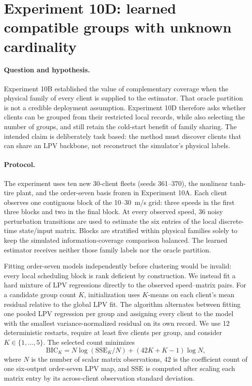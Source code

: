 \section{Experiment 10D: learned compatible groups with unknown cardinality}
\label{sec:experiment10d}

\paragraph{Question and hypothesis.}
Experiment 10B established the value of complementary coverage when the
physical family of every client is supplied to the estimator. That oracle
partition is not a credible deployment assumption. Experiment 10D therefore
asks whether clients can be grouped from their restricted local records, while
also selecting the number of groups, and still retain the cold-start benefit
of family sharing. The intended claim is deliberately task based: the method
must discover clients that can share an LPV backbone, not reconstruct the
simulator's physical labels.

\paragraph{Protocol.}
The experiment uses ten new 30-client fleets (seeds 361--370), the nonlinear
tanh-tire plant, and the order-seven basis frozen in Experiment 10A. Each
client observes one contiguous block of the 10--30~m/s grid: three speeds in
the first three blocks and two in the final block. At every observed speed,
36 noisy perturbation transitions are used to estimate the six entries of the
local discrete-time state/input matrix. Blocks are stratified within physical
families solely to keep the simulated information-coverage comparison
balanced. The learned estimator receives neither those family labels nor the
oracle partition.

Fitting order-seven models independently before clustering would be invalid:
every local scheduling block is rank deficient by construction. We instead fit
a hard mixture of LPV regressions directly to the observed speed--matrix pairs.
For a candidate group count $K$, initialization uses $K$-means on each
client's mean residual relative to the global LPV fit. The algorithm alternates
between fitting one pooled LPV regression per group and assigning every client
to the model with the smallest variance-normalized residual on its own record.
We use 12 deterministic restarts, require at least five clients per group, and
consider $K\in\{1,\ldots,5\}$. The selected count minimizes
\begin{equation}
 \mathrm{BIC}_K=N\log(\mathrm{SSE}_K/N)
 +(42K+K-1)\log N,
\end{equation}
where $N$ is the number of scalar matrix observations, 42 is the coefficient
count of one six-output order-seven LPV map, and SSE is computed after scaling
each matrix entry by its across-client observation standard deviation.

